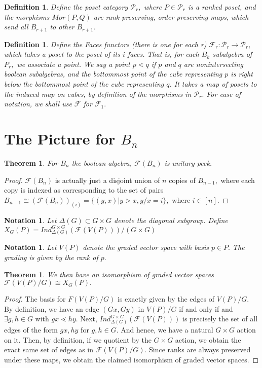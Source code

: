 \documentclass{amsart}
\newtheorem{thm}[subsubsection]{Theorem}
\newtheorem{defn}[subsubsection]{Definition}
\newtheorem{note}[subsubsection]{Notation}
\begin{document}
\begin{defn}
Define the poset category $\mathcal P_r,$ where $P \in \mathcal P_r$ is a ranked poset, and the morphisms $Mor(P,Q)$ are rank preserving, order preserving maps, which send all $B_{r+1}$ to other $B_{r+1}$.
\end{defn}

\begin{defn}
Define the Faces functors (there is one for each r) $\mathcal F_r:\mathcal P_r \rightarrow \mathcal P_r,$ which takes a poset to the poset of its $i$ faces. That is, for each $B_k$ subalgebra of $P_r,$ we associate a point. We say a point $p \lessdot q$ if $p$ and $q$ are nonintersecting boolean subalgebras, and the bottommost point of the cube representing $p$ is right below the bottommost point of the cube representing $q$. It takes a map of posets to the induced map on cubes, by definition of the morphisms in $\mathcal P_r.$ For ease of notation, we shall use $\mathcal F$ for $\mathcal F_1.$
\end{defn}

\section{The Picture for $B_n$}

\begin{thm}
\label{boolean_edge_peck}
For $B_n$ the boolean algebra, $\mathcal F(B_n)$ is unitary peck.
\end{thm}
\begin{proof}
$\mathcal F(B_n)$ is actually just a disjoint union of $n$ copies of $B_{n-1},$ where each copy is indexed as corresponding to the set of pairs $B_{n-1} \cong (\mathcal F(B_n))_{(i)} =\{(y,x)|y\gtrdot x,y/x = i\},$ where $i \in [n].$
\end{proof}
\begin{note}
Let $\Delta(G) \subset G\times G$ denote the diagonal subgroup.
Define $X_G(P) = Ind_{\Delta(G)}^{G\times G}(\mathcal F(V(P)))/(G\times G)$
\end{note}

\begin{note}
Let $V(P)$ denote the graded vector space with basis $p \in P.$ The grading is given by the rank of $p.$
\end{note}

\begin{thm}
\label{xg_isomorphism} We then have an isomorphism of graded vector spaces $\mathcal F(V(P)/G)\cong X_G(P).$
\end{thm}
\begin{proof}
The basis for $F(V(P)/G)$ is exactly given by the edges of $V(P)/G.$ By definition, we have an edge $(Gx,Gy)$ in $V(P)/G$ if and only if and $\exists g,h \in G$ with $gx \lessdot hy.$ Next, $Ind_{\Delta(G)}^{G\times G}(\mathcal F(V(P)))$ is precisely the set of all edges of the form $gx,hy$ for $g,h \in G.$ And hence, we have a natural $G \times G$ action on it. Then, by definition, if we quotient by the $G\times G$ action, we obtain the exact same set of edges as in $\mathcal F(V(P)/G).$ Since ranks are always preserved under these maps, we obtain the claimed isomorphism of graded vector spaces.
\end{proof}
\end{document}
